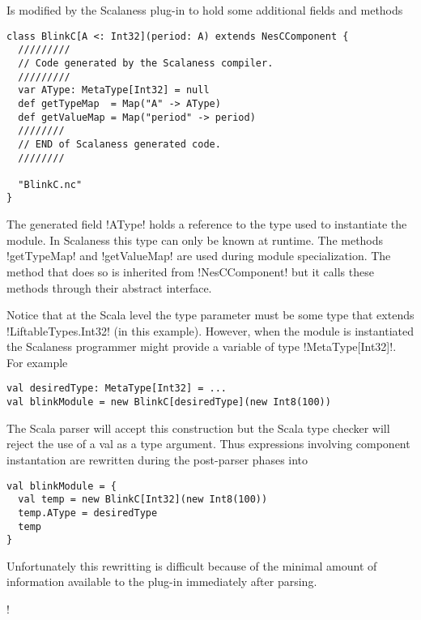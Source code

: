 Is modified by the Scalaness plug-in to hold some additional fields and methods

\singlespace
\begin{lstlisting}[language=scalaness]
class BlinkC[A <: Int32](period: A) extends NesCComponent {
  /////////
  // Code generated by the Scalaness compiler.
  /////////
  var AType: MetaType[Int32] = null
  def getTypeMap  = Map("A" -> AType)
  def getValueMap = Map("period" -> period)
  ////////
  // END of Scalaness generated code.
  ////////

  "BlinkC.nc"
}
\end{lstlisting}
\primaryspacing

The generated field !AType! holds a reference to the type used to instantiate the module. In
Scalaness this type can only be known at runtime. The methods !getTypeMap! and !getValueMap! are
used during module specialization. The method that does so is inherited from !NesCComponent! but
it calls these methods through their abstract interface.

Notice that at the Scala level the type parameter must be some type that extends
!LiftableTypes.Int32! (in this example). However, when the module is instantiated the Scalaness
programmer might provide a variable of type !MetaType[Int32]!. For example

\singlespace
\begin{lstlisting}[language=scalaness]
val desiredType: MetaType[Int32] = ...
val blinkModule = new BlinkC[desiredType](new Int8(100))
\end{lstlisting}
\primaryspacing

The Scala parser will accept this construction but the Scala type checker will reject the use of
a val as a type argument. Thus expressions involving component instantation are rewritten during
the post-parser phases into

\singlespace
\begin{lstlisting}[language=scalaness]
val blinkModule = {
  val temp = new BlinkC[Int32](new Int8(100))
  temp.AType = desiredType
  temp
}
\end{lstlisting}
\primaryspacing

Unfortunately this rewritting is difficult because of the minimal amount of information
available to the plug-in immediately after parsing.

\lstDeleteShortInline!

